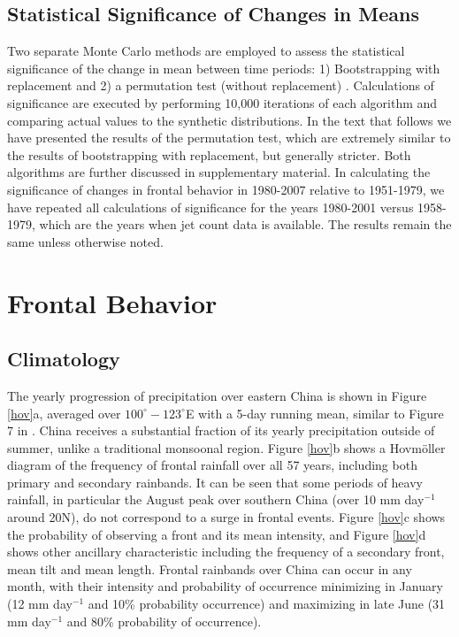\documentclass[draft,grl]{AGUTeX}
\begin{document}
\begin{article}

\subsection{Statistical Significance of Changes in Means}

	Two separate Monte Carlo methods are employed to assess the statistical significance of the change in mean between time periods: 1) Bootstrapping with replacement and 2) a permutation test (without replacement) \citep{Good2005}. Calculations of significance are executed by performing 10,000 iterations of each algorithm and comparing actual values to the synthetic distributions. In the text that follows we have presented the results of the permutation test, which are extremely similar to the results of bootstrapping with replacement, but generally stricter. Both algorithms are further discussed in supplementary material. In calculating the significance of changes in frontal behavior in 1980-2007 relative to 1951-1979, we have repeated all calculations of significance for the years 1980-2001 versus 1958-1979, which are the years when jet count data is available. The results remain the same unless otherwise noted.


\section{Frontal Behavior}	
	
\subsection{Climatology}	

	The yearly progression of precipitation over eastern China is shown in Figure \ref{hov}a, averaged over $100^\circ-123^\circ$E with a 5-day running mean, similar to Figure 7 in \citet{Ding2005}. China receives a substantial fraction of its yearly precipitation outside of summer, unlike a traditional monsoonal region. Figure \ref{hov}b shows a Hovm\"oller diagram of the frequency of frontal rainfall over all 57 years, including both primary and secondary rainbands. It can be seen that some periods of heavy rainfall, in particular the August peak over southern China (over 10 mm day$^{-1}$ around 20\textdegree N), do not correspond to a surge in frontal events. Figure \ref{hov}c shows the probability of observing a front and its mean intensity, and Figure \ref{hov}d shows other ancillary characteristic including the frequency of a secondary front, mean tilt and mean length. Frontal rainbands over China can occur in any month, with their intensity and probability of occurrence minimizing in January (12 mm day$^{-1}$ and 10\% probability occurrence) and maximizing in late June (31 mm day$^{-1}$ and 80\% probability of occurrence).
	

\end{article}
\end{document}

